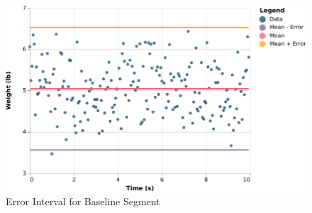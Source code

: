 \begin{figure} \label{figure.baseline.interval}
    \centering
    \includegraphics{chart/00-intro/baseline-error-interval.pdf}
    \caption{Error Interval for Baseline Segment}
\end{figure}

